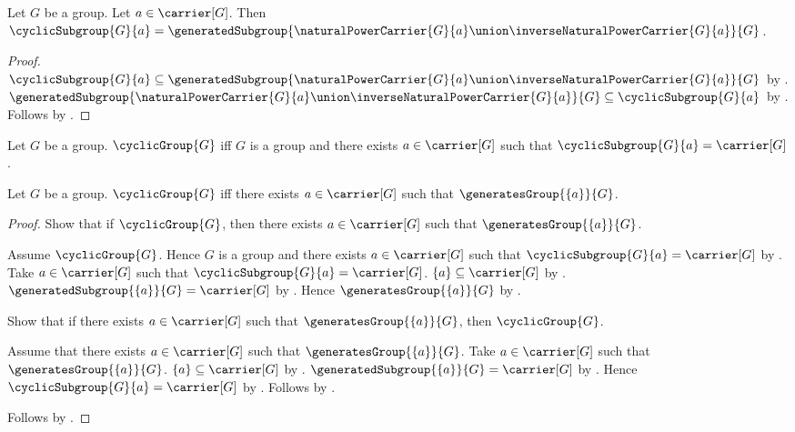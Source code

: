 \begin{theorem}\label{cyclic_subgroup_generated_by_signed_natural_powers}
    Let $G$ be a group.
    Let $a\in\carrier[G]$.
    Then
        $\cyclicSubgroup{G}{a}=
            \generatedSubgroup{
                \naturalPowerCarrier{G}{a}\union
                    \inverseNaturalPowerCarrier{G}{a}}{G}$.
\end{theorem}
\begin{proof}
    $\cyclicSubgroup{G}{a}\subseteq
        \generatedSubgroup{
            \naturalPowerCarrier{G}{a}\union
                \inverseNaturalPowerCarrier{G}{a}}{G}$ by
        .
    $\generatedSubgroup{
        \naturalPowerCarrier{G}{a}\union
            \inverseNaturalPowerCarrier{G}{a}}{G}
        \subseteq\cyclicSubgroup{G}{a}$ by
        .
    Follows by .
\end{proof}

\begin{definition}\label{cyclic_group}
    Let $G$ be a group.
    $\cyclicGroup{G}$ iff
        $G$ is a group and
        there exists $a\in\carrier[G]$ such that
            $\cyclicSubgroup{G}{a}=\carrier[G]$.
\end{definition}

\begin{proposition}\label{cyclic_group_iff_singleton_generates}
    Let $G$ be a group.
    $\cyclicGroup{G}$ iff
        there exists $a\in\carrier[G]$ such that
            $\generatesGroup{\{a\}}{G}$.
\end{proposition}
\begin{proof}
    Show that if $\cyclicGroup{G}$, then
        there exists $a\in\carrier[G]$ such that
            $\generatesGroup{\{a\}}{G}$.
    \begin{subproof}
        Assume $\cyclicGroup{G}$.
        Hence $G$ is a group and there exists $a\in\carrier[G]$
            such that $\cyclicSubgroup{G}{a}=\carrier[G]$ by
            .
        Take $a\in\carrier[G]$ such that
            $\cyclicSubgroup{G}{a}=\carrier[G]$.
        $\{a\}\subseteq\carrier[G]$ by
            .
        $\generatedSubgroup{\{a\}}{G}=\carrier[G]$ by
            .
        Hence $\generatesGroup{\{a\}}{G}$ by
            .
    \end{subproof}
    Show that if there exists $a\in\carrier[G]$ such that
        $\generatesGroup{\{a\}}{G}$, then $\cyclicGroup{G}$.
    \begin{subproof}
        Assume that there exists $a\in\carrier[G]$ such that
            $\generatesGroup{\{a\}}{G}$.
        Take $a\in\carrier[G]$ such that
            $\generatesGroup{\{a\}}{G}$.
        $\{a\}\subseteq\carrier[G]$ by
            .
        $\generatedSubgroup{\{a\}}{G}=\carrier[G]$ by
            .
        Hence $\cyclicSubgroup{G}{a}=\carrier[G]$ by
            .
        Follows by .
    \end{subproof}
    Follows by \auto.
\end{proof}
